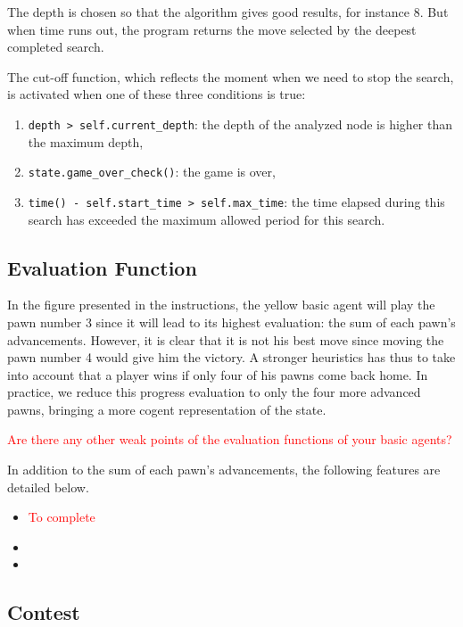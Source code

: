 \documentclass[journal,onecolumn]{IEEEtran}
\newcommand{\py}[1]{\texttt{#1}}
\begin{document}
The depth is chosen so that the algorithm gives good results, for instance 8. But when time runs out, the program returns the move selected by the deepest completed search.

The cut-off function, which reflects the moment when we need to stop the search, is activated when one of these three conditions is true:

\begin{enumerate}
 \item \py{depth > self.current_depth}: the depth of the analyzed node is higher than the maximum depth,
 \item \py{state.game_over_check()}: the game is over,
 \item \py{time() - self.start_time > self.max_time}: the time elapsed during this search has exceeded the maximum allowed period for this search.
\end{enumerate}

\subsection{Evaluation Function}

In the figure presented in the instructions, the yellow basic agent will play the pawn number 3 since it will lead to its highest evaluation: the sum of each pawn’s advancements. However, it is clear that it is not his best move since moving the pawn number 4 would give him the victory. A stronger heuristics has thus to take into account that a player wins if only four of his pawns come back home. In practice, we reduce this progress evaluation to only the four more advanced pawns, bringing a more cogent representation of the state.

\textcolor{red}{Are there any other weak points of the evaluation functions of your basic agents?}

In addition to the sum of each pawn’s advancements, the following features are detailed below.

\begin{itemize}
 \item \textcolor{red}{To complete}
 \item 
 \item 
\end{itemize}



\subsection{Contest}



\end{document}
